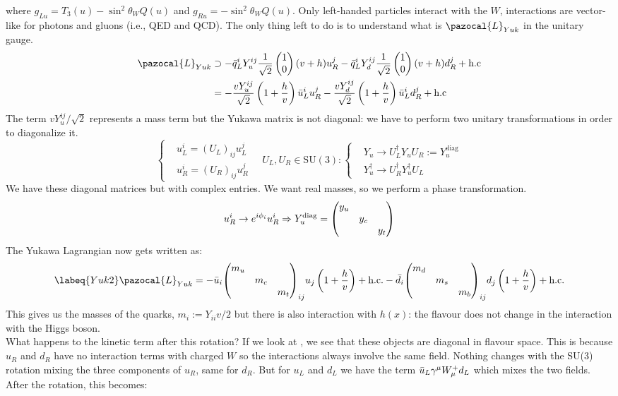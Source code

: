 \documentclass[../main.tex]{subfiles}
\begin{document}
where $g_{Lu}=T_3(u)-\sin^2\theta_WQ(u)$ and $g_{Ru}=-\sin^2\theta_WQ(u)$. Only left-handed particles interact with the $W$, interactions are vector-like for photons and gluons (i.e., QED and QCD). The only thing left to do is to understand what is $\pazocal{L}_{Yuk}$ in the unitary gauge.
\begin{align*}
\pazocal{L}_{Yuk}&\supset-\Bar{q}_L^iY_u^{ij}\frac{1}{\sqrt{2}}\begin{pmatrix}
    1\\0
\end{pmatrix}(v+h)u_R^j-\Bar{q}_L^iY_d^{ij}\frac{1}{\sqrt{2}}\begin{pmatrix}
    1\\0
\end{pmatrix}(v+h)d_R^j+\text{h.c}\\
&=-\frac{vY_u^{ij}}{\sqrt{2}}\left(1+\frac{h}{v}\right)\Bar{u}_L^iu_R^j-\frac{vY_d^{ij}}{\sqrt{2}}\left(1+\frac{h}{v}\right)\Bar{u}_L^id_R^j+\text{h.c}
\end{align*}
The term $vY_u^{ij}/\sqrt{2}$ represents a mass term but the Yukawa matrix is not diagonal: we have to perform two unitary transformations in order to diagonalize it.
\[
\left\{
\begin{aligned}
&u_L^i=(U_L)_{ij}u_L^j\\
&u_R^i=(U_R)_{ij}u_R^j
\end{aligned}
\right.
\quad 
U_L,U_R\in\text{SU}(3):
\left\{
\begin{aligned}
&Y_u\to U_L^\dagger Y_uU_R:=Y_u^{\text{diag}}\\
&Y_u^\dagger\to U_R^\dagger Y_u^\dagger U_L
\end{aligned}
\right.
\]
We have these diagonal matrices but with complex entries. We want real masses, so we perform a phase transformation.
\[
u_R^i\to e^{i\phi_i}u_R^i\Rightarrow Y_u^{\text{diag}}=\mqty(\dmat{y_u,y_c,y_t})
\]
The Yukawa Lagrangian now gets written as:
\begin{equation}
\labeq{Yuk2}
\pazocal{L}_{Yuk}=-\Bar{u}_i\mqty(\dmat{m_u,m_c,m_t})_{ij}u_j\left(1+\frac{h}{v}\right)+\text{h.c.}-\Bar{d}_i\mqty(\dmat{m_d,m_s,m_b})_{ij}d_j\left(1+\frac{h}{v}\right)+\text{h.c.}
\end{equation}
This gives us the masses of the quarks, $m_i:=Y_{ii}v/2$ but there is also interaction with $h(x)$: the flavour does not change in the interaction with the Higgs boson.\\
What happens to the kinetic term after this rotation? If we look at , we see that these objects are diagonal in flavour space. This is because $u_R$ and $d_R$ have no interaction terms with charged $W$ so the interactions always involve the same field. Nothing changes with the SU(3) rotation mixing the three components of $u_R$, same for $d_R$. But for $u_L$ and $d_L$ we have the term $\Bar{u}_L\gamma^\mu W_\mu^+d_L$ which mixes the two fields. After the rotation, this becomes:
\end{document}
